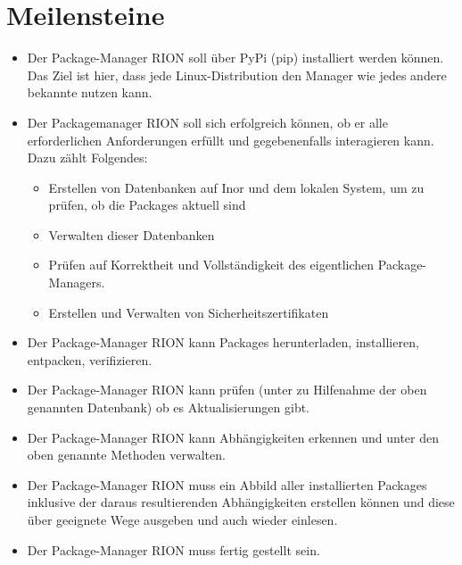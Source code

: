 \section{Meilensteine}

\begin{itemize}
	\item 
		Der Package-Manager RION soll über PyPi (pip) installiert werden können. Das Ziel ist hier, dass jede Linux-Distribution den Manager wie jedes andere bekannte  nutzen kann.
	
	\item Der Packagemanager RION soll sich erfolgreich  können, ob er alle erforderlichen Anforderungen erfüllt und gegebenenfalls interagieren kann. Dazu zählt Folgendes:
		
		\begin{itemize}	
			\item Erstellen von Datenbanken auf Inor und dem lokalen System, um zu prüfen, ob die Packages aktuell sind
			\item Verwalten dieser Datenbanken
			\item Prüfen auf Korrektheit und Vollständigkeit des eigentlichen Package-Managers.
			\item Erstellen und Verwalten von Sicherheitszertifikaten
		\end{itemize}
	\item Der Package-Manager RION kann Packages herunterladen, installieren, entpacken, verifizieren.
	\item Der Package-Manager RION kann prüfen (unter zu Hilfenahme der oben genannten Datenbank) ob es Aktualisierungen gibt.
	\item Der Package-Manager RION kann Abhängigkeiten erkennen und unter den oben genannte Methoden verwalten.
	\item Der Package-Manager RION muss ein Abbild aller installierten Packages inklusive der daraus resultierenden Abhängigkeiten erstellen können und diese über geeignete Wege ausgeben und auch wieder einlesen.
	\item Der Package-Manager RION muss fertig gestellt sein.
\end{itemize}